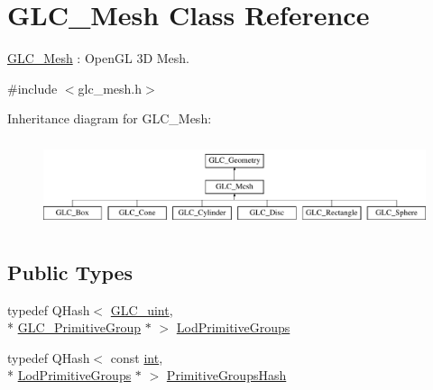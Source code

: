 \hypertarget{class_g_l_c___mesh}{\section{G\-L\-C\-\_\-\-Mesh Class Reference}
\label{class_g_l_c___mesh}
}


\hyperlink{class_g_l_c___mesh}{G\-L\-C\-\_\-\-Mesh} \-: Open\-G\-L 3\-D Mesh.  




{\ttfamily \#include $<$glc\-\_\-mesh.\-h$>$}

Inheritance diagram for G\-L\-C\-\_\-\-Mesh\-:\begin{figure}[H]
\begin{center}
\leavevmode
\includegraphics[height=2.592592cm]{class_g_l_c___mesh}
\end{center}
\end{figure}
\subsection*{Public Types}
\begin{DoxyCompactItemize}
\item 
typedef Q\-Hash$<$ \hyperlink{glc__global_8h_abf950976fabed69026558df8e2da6c6b}{G\-L\-C\-\_\-uint}, \\*
\hyperlink{class_g_l_c___primitive_group}{G\-L\-C\-\_\-\-Primitive\-Group} $\ast$ $>$ \hyperlink{class_g_l_c___mesh_a0a11b2f6d1bc53db43730a7427f3f0d5}{Lod\-Primitive\-Groups}
\item 
typedef Q\-Hash$<$ const \hyperlink{ioapi_8h_a787fa3cf048117ba7123753c1e74fcd6}{int}, \\*
\hyperlink{class_g_l_c___mesh_a0a11b2f6d1bc53db43730a7427f3f0d5}{Lod\-Primitive\-Groups} $\ast$ $>$ \hyperlink{class_g_l_c___mesh_ac9d1c131c1c6044dbc79112dcaa1dfeb}{Primitive\-Groups\-Hash}
\end{DoxyCompactItemize}
